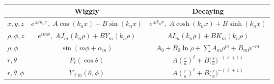 \documentclass[10pt]{article}
\begin{document}
\begin{multicols}{2}
\begin{tabular}{| l | c | c |}
		& Wiggly & Decaying \\ \hline
		$x,y,z$ &$ e^{\pm i k_n x}, \; A \cos(k_n x) + B\sin(k_n x)$ & $e^{\pm k_n x}, \; A \cosh( k_n x) + B \sinh(k_n x)$ \\ \hline
		$\rho,\phi,z$ & $e^{i m \phi}, \; A J_m(k_n \rho) + B Y_m(k_n \rho)$ & $ A I_m(k_n \rho) + B K_m(k_n \rho)$ \\ \hline
		$\rho,\phi$ & $\sin(m \phi + \alpha_m)$ & $A_0 + B_0 \ln \rho + \sum A_m \rho^m + B_m \rho^{-m}$ \\ \hline
		$r,\theta$ & $P_\ell(\cos \theta)$ & $A \left( \frac{r}{a} \right)^\ell + B \big( \frac{r}{a} \big)^{-(\ell+1)} $ \\ \hline
		$r, \theta, \phi$ & $Y_{\ell m}(\theta, \phi)$ &  $A \left( \frac{r}{a} \right)^\ell + B \big( \frac{r}{a} \big)^{-(\ell+1)} $ \\ \hline
	\end{tabular}
\end{multicols}
 
\end{document}
